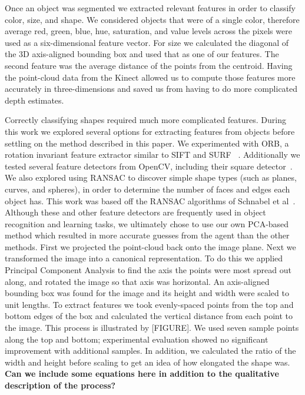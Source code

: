 \documentclass[11pt]{article}
\newcommand{\xxx}[1]{{\bf \color{red} #1}}
\begin{document}
Once an object was segmented we extracted relevant features in order to classify
color, size, and shape. We considered objects that were of a single color, therefore
average red, green, blue, hue, saturation, and value levels across the pixels were
used as a six-dimensional feature vector. For size we calculated the diagonal of the 3D
axis-aligned bounding box and used that as one of our features. The second feature was
the average distance of the points from the centroid. Having the point-cloud data from
the Kinect allowed us to compute those features more accurately in three-dimensions
and saved us from having to do more complicated depth estimates.

Correctly classifying shapes required much more complicated features.
During this work we explored several options for extracting features from
objects before settling on the method described in this paper. We experimented
with ORB, a rotation invariant feature extractor similar to SIFT and SURF
~\cite{rublee2011orb}. Additionally we tested several feature detectors from
OpenCV, including their square detector~\cite{opencv_library}. We also explored
using RANSAC to discover simple shape types (such as planes, curves, and spheres),
in order to determine the number of faces and edges each object has. This work
was based off the RANSAC algorithms of Schnabel et
al~\cite{schnabel2007efficient}. Although these and other feature detectors are
frequently used in object recognition and learning tasks, we ultimately chose to
use our own PCA-based method which resulted in more accurate guesses from the
agent than the other methods. First we
projected the point-cloud back onto the image plane. Next we transformed the image
into a canonical representation. To do this we applied Principal Component Analysis to
find the axis the points were most spread out along, and rotated the image so that
axis was horizontal. An axis-aligned bounding box was found for the image and its
height and width were scaled to unit lengths. To extract features we took evenly-spaced
points from the top and bottom edges of the box and calculated the vertical distance
from each point to the image. This process is illustrated by [FIGURE]. We used seven
sample points along the top and bottom; experimental evaluation showed no significant
improvement with additional samples. In addition, we calculated the ratio of the width
and height before scaling to get an idea of how elongated the shape was.
\xxx{Can we include some equations here in addition to the qualitative description
of the process?}
\end{document}
